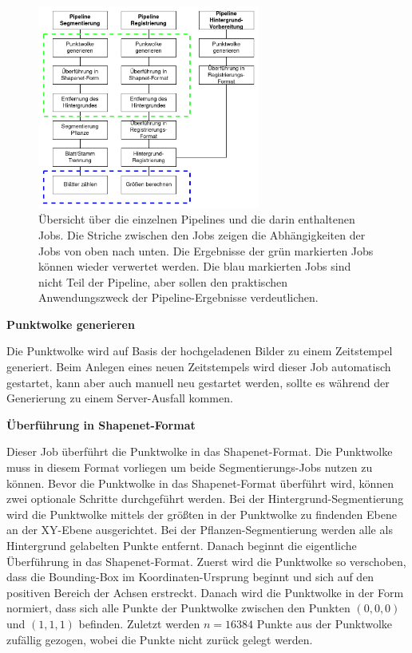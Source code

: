 \documentclass[12pt,titlepage, twoside]{article}
\begin{document}
\begin{figure}
    \centering
    \includegraphics[width=0.65\textwidth]{./Images/Pipelines.png}
    \caption{Übersicht über die einzelnen Pipelines und die darin enthaltenen Jobs. Die Striche zwischen den Jobs zeigen die Abhängigkeiten der Jobs von oben nach unten.
    Die Ergebnisse der grün markierten Jobs können wieder verwertet werden. 
    Die blau markierten Jobs sind nicht Teil der Pipeline, aber sollen den praktischen Anwendungszweck der Pipeline-Ergebnisse verdeutlichen.}
    \label{fig:Pipelines}
\end{figure}

\textbf{Punktwolke generieren}

Die Punktwolke wird auf Basis der hochgeladenen Bilder zu einem Zeitstempel generiert. 
Beim Anlegen eines neuen Zeitstempels wird dieser Job automatisch gestartet, kann aber auch manuell neu gestartet werden, sollte es während der Generierung zu einem Server-Ausfall kommen.

\textbf{Überführung in Shapenet-Format}

Dieser Job überführt die Punktwolke in das Shapenet-Format. Die Punktwolke muss in diesem Format vorliegen um beide Segmentierungs-Jobs nutzen zu können.
Bevor die Punktwolke in das Shapenet-Format überführt wird, können zwei optionale Schritte durchgeführt werden.
Bei der Hintergrund-Segmentierung wird die Punktwolke mittels der größten in der Punktwolke zu findenden Ebene an der XY-Ebene ausgerichtet.
Bei der Pflanzen-Segmentierung werden alle als Hintergrund gelabelten Punkte entfernt. Danach beginnt die eigentliche Überführung in das Shapenet-Format.
Zuerst wird die Punktwolke so verschoben, dass die Bounding-Box im Koordinaten-Ursprung beginnt und sich auf den positiven Bereich der Achsen erstreckt.
Danach wird die Punktwolke in der Form normiert, dass sich alle Punkte der Punktwolke zwischen den Punkten $(0,0,0)$ und $(1,1,1)$ befinden.
Zuletzt werden $n=16384$ Punkte aus der Punktwolke zufällig gezogen, wobei die Punkte nicht zurück gelegt werden.
\end{document}
